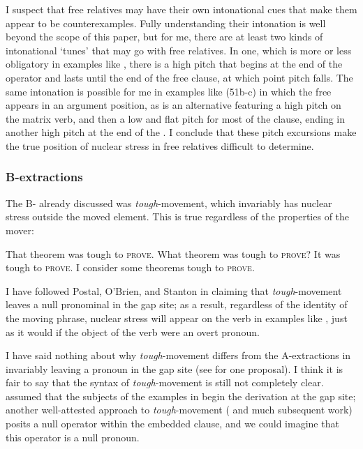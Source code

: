 \documentclass[output=paper]{LSP/langsci}
\begin{document}
I suspect that free relatives may have their own intonational cues that make them appear to be counterexamples.  Fully understanding their intonation is well beyond the scope of this paper, but for me, there are at least two kinds of intonational ‘tunes’ that may go with free relatives.  In one, which is more or less obligatory in examples like , there is a high pitch that begins at the end of the  operator and lasts until the end of the free  clause, at which point pitch falls.  The same intonation is possible for me in examples like (51b-c) in which the free  appears in an argument position, as is an alternative featuring a high pitch on the matrix verb, and then a low and flat pitch for most of the  clause, ending in another high pitch at the end of the .  I conclude that these pitch excursions make the true position of nuclear stress in free relatives difficult to determine.

\subsubsection{B-extractions}

The B- already discussed was \textit{tough}{}-movement, which invariably has nuclear stress outside the moved element.  This is true regardless of the properties of the mover:


\ea%
    \label{ex:richards:52}

\ea That theorem was tough to \textsc{prove}.
\ex What theorem was tough to \textsc{prove}?
\ex It was tough to \textsc{prove}.
\ex I consider some theorems tough to \textsc{prove}.
\z
\z

I have followed Postal, O’Brien, and Stanton in claiming that \textit{tough}{}-movement leaves a null pronominal in the gap site; as a result, regardless of the identity of the moving phrase, nuclear stress will appear on the verb in examples like , just as it would if the object of the verb were an overt pronoun.

  I have said nothing about why \textit{tough}{}-movement differs from the A-extractions in invariably leaving a pronoun in the gap site (see \citealt{Stanton2016} for one proposal).  I think it is fair to say that the syntax of \textit{tough}{}-movement is still not completely clear.  \citet{Bresnan1971} assumed that the subjects of the examples in  begin the derivation at the gap site; another well-attested approach to \textit{tough}{}-movement (\citealt{Chomsky1977} and much subsequent work) posits a null operator within the embedded clause, and we could imagine that this operator is a null pronoun.  
\end{document}
